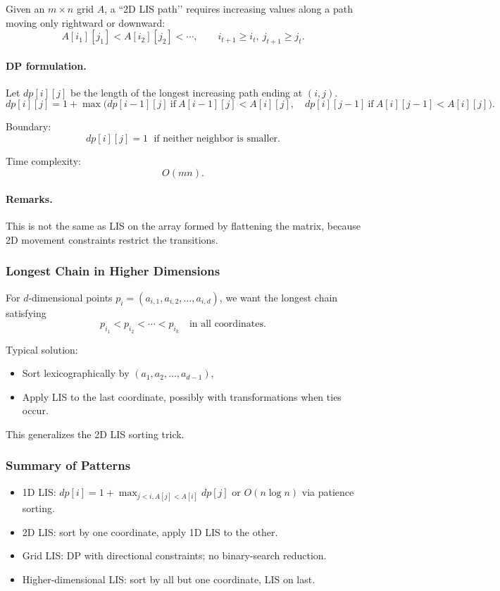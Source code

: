 \documentclass[9pt]{extarticle}
\begin{document}
Given an $m\times n$ grid $A$, a “2D LIS path’’ requires increasing values along 
a path moving only rightward or downward:
\[
A[i_1][j_1] < A[i_2][j_2] < \cdots,
\qquad
i_{t+1} \ge i_t,\ j_{t+1} \ge j_t.
\]

\paragraph{DP formulation.}
Let $dp[i][j]$ be the length of the longest increasing path ending at $(i,j)$.
\[
dp[i][j] = 1 + \max\Big( dp[i-1][j]\ \text{if}\ A[i-1][j] < A[i][j],\quad
                         dp[i][j-1]\ \text{if}\ A[i][j-1] < A[i][j]\Big).
\]

Boundary:
\[
dp[i][j] = 1 \;\text{ if neither neighbor is smaller.}
\]

Time complexity:
\[
O(mn).
\]

\paragraph{Remarks.}
This is not the same as LIS on the array formed by flattening the matrix,
because 2D movement constraints restrict the transitions.

\subsubsection{Longest Chain in Higher Dimensions}

For $d$-dimensional points $p_i = (a_{i,1},a_{i,2},\dots,a_{i,d})$, we want the
longest chain satisfying
\[
p_{i_1} < p_{i_2} < \cdots < p_{i_k}
\quad\text{in all coordinates}.
\]

Typical solution:
\begin{itemize}
    \item Sort lexicographically by $(a_{1},a_{2},\dots,a_{d-1})$,
    \item Apply LIS to the last coordinate, possibly with transformations when
          ties occur.
\end{itemize}

This generalizes the 2D LIS sorting trick.

\subsubsection*{Summary of Patterns}

\begin{itemize}
    \item 1D LIS: $dp[i] = 1 + \max_{j<i, A[j]<A[i]} dp[j]$ or 
          $O(n\log n)$ via patience sorting.
    \item 2D LIS: sort by one coordinate, apply 1D LIS to the other.
    \item Grid LIS: DP with directional constraints; no binary-search reduction.
    \item Higher-dimensional LIS: sort by all but one coordinate, LIS on last.
\end{itemize}
\end{document}
